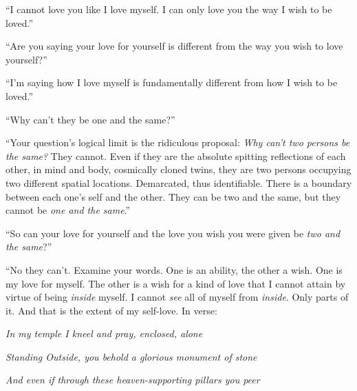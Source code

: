 \documentclass{article}
\begin{document}
\newline

``I cannot love you like I love myself. I can only love you the way
I wish to be loved.''
\newline
\newline

``Are you saying your love for yourself is different from the way you
wish to love yourself?''
\newline
\newline

``I'm saying how I love myself is fundamentally different from how
I wish to be loved.''
\newline
\newline

``Why can't they be one and the same?'' 
\newline
\newline

``Your question's logical limit is the ridiculous proposal: \textit{Why
can't two persons be the same?} They cannot. Even if they are the
absolute spitting reflections of each other, in mind and body,
cosmically cloned twins, they are two persons occupying two different
spatial locations. Demarcated, thus identifiable. There is a boundary
between each one's self and the other. They can be two and the same, but
they cannot be \textit{one and the same}.'' \newline \newline

``So can your love for yourself and the love you wish you were given be
\textit{two and the same}?'' \newline
\newline

``No they can't. Examine your words. One is an ability, the other
a wish. One is my love for myself. The other is a wish for a kind of
love that I cannot attain by virtue of being \textit{inside} myself.
I cannot \textit{see} all of myself from \textit{inside}. Only parts of
it. And that is the extent of my self-love. In verse:\newline\newline

\textit{In my temple I kneel and pray, enclosed, alone}\newline

\textit{Standing Outside, you behold a glorious monument of
stone}\newline 

\textit{And even if through these heaven-supporting pillars you peer}
\newline 
\end{document}
